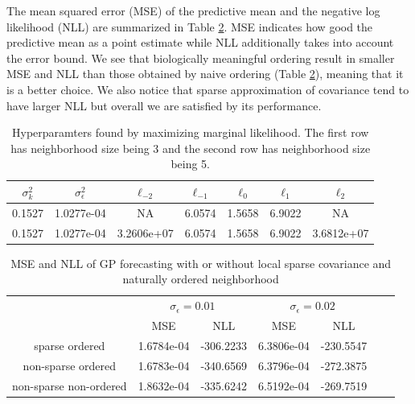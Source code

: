 \documentclass[smallextended,natbib]{svjour3}       %
\begin{document}
The mean squared error (MSE) of the predictive mean and the negative log likelihood (NLL) are summarized in Table \ref{tab:MSE-and-NLL}. MSE indicates how good the predictive mean as a point estimate while NLL additionally takes into account the error bound. We see that biologically meaningful ordering result in smaller MSE and NLL than those obtained by naive ordering (Table \ref{tab:MSE-and-NLL}), meaning that it is a better choice. We also notice that sparse approximation of covariance tend to have larger NLL but overall we are satisfied by its performance. 

\begin{table}[h]
\begin{center}
\caption{Hyperparamters found by maximizing marginal likelihood. The first row has neighborhood size being 3 and the second row has neighborhood size being 5.}
\label{tab:length scales}
\begin{tabular}{ccccccc} \hline
 $\sigma_{k}^{2}$ & $\sigma_{\epsilon}^{2}$ & $\ell_{-2}$ & $\ell_{-1}$ & $\ell_{0}$ & $\ell_{1}$ & $\ell_{2}$ \\ \hline
0.1527 & 1.0277e-04 & NA & 6.0574 & 1.5658 & 6.9022 & NA\\ 
0.1527 & 1.0277e-04 & 3.2606e+07 & 6.0574 & 1.5658 & 6.9022 & 3.6812e+07\\ \hline
\end{tabular}
\end{center}
\end{table}


\begin{table}[h]
\begin{center}
\caption[MSE and NLL of GP Forecasting with or without Local Sparse Covariance and Naturally Ordered Neighborhood] {MSE and NLL of GP forecasting with or without local sparse covariance and naturally ordered neighborhood}
\label{tab:MSE-and-NLL}
\begin{tabular}{ccccccc} \hline
\multirow{2}{*}{} & \multicolumn{2}{c}{$\sigma_{\epsilon}=0.01$} & \multicolumn{2}{c}{$\sigma_{\epsilon}=0.02$} \\
\cmidrule{2-5} \cmidrule{3-5} \cmidrule{4-5} \cmidrule{5-5} 
 & MSE & NLL & MSE & NLL\\ \hline
sparse ordered & 1.6784e-04 & -306.2233 & 6.3806e-04 & -230.5547 \\
non-sparse ordered & 1.6783e-04 & -340.6569 & 6.3796e-04 & -272.3875 \\
non-sparse non-ordered & 1.8632e-04 & -335.6242 & 6.5192e-04 & -269.7519 \\ \hline
\end{tabular}
\end{center}
\end{table}
\end{document}
